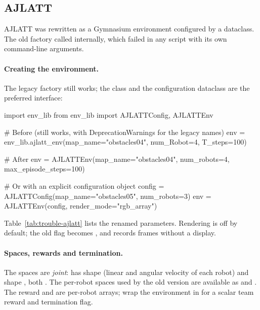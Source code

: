 \subsection{AJLATT}\label{sec:migration-ajlatt}

AJLATT was rewritten as a Gymnasium environment configured by a dataclass.
The old factory called  internally, which failed
in any script with its own command-line arguments.

\paragraph{Creating the environment.} The legacy factory still works; the
class and the configuration dataclass are the preferred interface:

\begin{pycode}
import env_lib
from env_lib import AJLATTConfig, AJLATTEnv

# Before (still works, with DeprecationWarnings for the legacy names)
env = env_lib.ajlatt_env(map_name="obstacles04", num_Robot=4, T_steps=100)

# After
env = AJLATTEnv(map_name="obstacles04", num_robots=4, max_episode_steps=100)

# Or with an explicit configuration object
config = AJLATTConfig(map_name="obstacles05", num_robots=3)
env = AJLATTEnv(config, render_mode="rgb_array")
\end{pycode}

Table~\ref{tab:trouble-ajlatt} lists the renamed parameters. Rendering is off
by default; the old  flag becomes
, and  records
frames without a display.

\paragraph{Spaces, rewards and termination.}
The spaces are \emph{joint}:  has shape
 (linear and angular velocity of each robot) and
 shape , both
. The per-robot spaces used by the old version are available as
 and . The reward
and  are per-robot arrays; wrap the environment in
 for a scalar team reward and termination flag.

